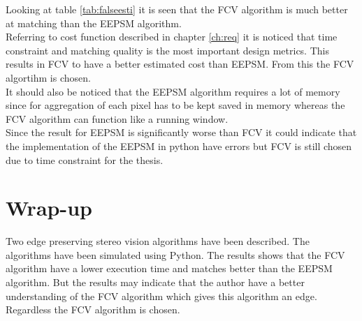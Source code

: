 Looking at table \vref{tab:falseesti} it is seen that the FCV algorithm is much better at matching than the EEPSM algorithm.\\

Referring to cost function described in chapter \vref{ch:req} it is noticed that time constraint and matching quality is the most important design metrics. This results in FCV to have a better estimated cost than EEPSM. From this the FCV algortihm is chosen.\\

It should also be noticed that the EEPSM algorithm requires a lot of memory since for aggregation of each pixel has to be kept saved in memory whereas the FCV algorithm can function like a running window. \\

Since the result for EEPSM is significantly worse than FCV it could indicate that the implementation of the EEPSM in python have errors but FCV is still chosen due to time constraint for the thesis. 

\section{Wrap-up}
Two edge preserving stereo vision algorithms have been described. The algorithms have been simulated using Python. The results shows that the FCV algorithm have a lower execution time and matches better than the EEPSM algorithm. But the results may indicate that the author have a better understanding of the FCV algorithm which gives this algorithm an edge. Regardless the FCV algorithm is chosen. 